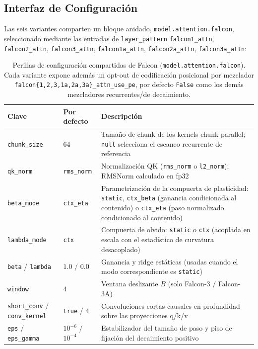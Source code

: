 \subsection{Interfaz de Configuración}

Las seis variantes comparten un bloque anidado, \texttt{model.attention.falcon}, seleccionado mediante las entradas de \texttt{layer\_pattern} \texttt{falcon1\_attn}, \texttt{falcon2\_attn}, \texttt{falcon3\_attn}, \texttt{falcon1a\_attn}, \texttt{falcon2a\_attn}, \texttt{falcon3a\_attn}:

\begin{table}[H]
\centering
\small
\begin{tabularx}{0.95\linewidth}{llX}
\toprule
\textbf{Clave} & \textbf{Por defecto} & \textbf{Descripción} \\
\midrule
\texttt{chunk\_size} & $64$ & Tamaño de chunk de los kernels chunk-parallel; \texttt{null} selecciona el escaneo recurrente de referencia \\
\texttt{qk\_norm} & \texttt{rms\_norm} & Normalización QK (\texttt{rms\_norm} o \texttt{l2\_norm}); RMSNorm calculado en fp32 \\
\texttt{beta\_mode} & \texttt{ctx\_eta} & Parametrización de la compuerta de plasticidad: \texttt{static}, \texttt{ctx\_beta} (ganancia condicionada al contenido) o \texttt{ctx\_eta} (paso normalizado condicionado al contenido) \\
\texttt{lambda\_mode} & \texttt{ctx} & Compuerta de olvido: \texttt{static} o \texttt{ctx} (acoplada en escala con el estadístico de curvatura desacoplado) \\
\texttt{beta} / \texttt{lambda} & $1.0$ / $0.0$ & Ganancia y ridge estáticas (usadas cuando el modo correspondiente es \texttt{static}) \\
\texttt{window} & $4$ & Ventana deslizante $B$ (solo Falcon-3 / Falcon-3A) \\
\texttt{short\_conv} / \texttt{conv\_kernel} & \texttt{true} / $4$ & Convoluciones cortas causales en profundidad sobre las proyecciones q/k/v \\
\texttt{eps} / \texttt{eps\_gamma} & $10^{-6}$ / $10^{-4}$ & Estabilizador del tamaño de paso y piso de fijación del decaimiento positivo \\
\bottomrule
\end{tabularx}
\caption{Perillas de configuración compartidas de Falcon (\texttt{model.attention.falcon}). Cada variante expone además un opt-out de codificación posicional por mezclador \texttt{falcon\{1,2,3,1a,2a,3a\}\_attn\_use\_pe}, por defecto \texttt{False} como los demás mezcladores recurrentes/de decaimiento.}
\label{tab:falcon-knobs}
\end{table}

